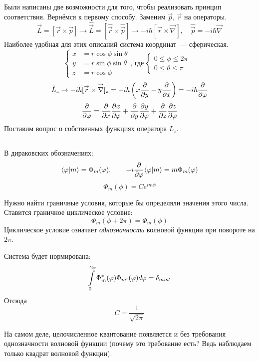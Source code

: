 \subsection{}
Были написаны две возможности для того, чтобы реализовать принцип соответствия. Вернёмся к первому способу.
Заменим $\vec p$, $\vec r$ на операторы.
\begingroup
\def \nla {\nabla}
\def \hvr {\hat{\vec r}}
\def \hvp {\hat{\vec p}}
\def \hvL {\hat{\vec L}}
    $$
        \vec L = [\vec r \times \vec p] \to
        \hvL = [\hvr \times \hvp ] \to
        -i\hbar [\vec r \times \vec \nla], \quad \hvp = -i\hbar \vec \nla
    $$
Наиболее удобная для этих описаний система координат~--- сферическая.
$$
    \begin{cases}
        x &= r \cos \phi \sin \theta \\
        y &= r \sin \phi \sin \theta \\
        z &= r \cos \phi
    \end{cases}, \, \text{где} \,
    \begin{cases}
        0 \leqslant \phi \leqslant 2\pi&\\
        0 \leqslant \theta \leqslant \pi&
    \end{cases}
$$
$$
    \Hat L_z \to -i\hbar [\vec r \times \vec \nla]_z = -i \hbar \left(
        x \ud{}{y} - y \ud{}{x}
    \right) = -i \hbar \ud{}{\phi}
$$
$$
    \dfrac{\partial }{\partial \varphi} = \dfrac{\partial }{\partial x} \dfrac{\partial x}{\partial \varphi} + \dfrac{\partial }{\partial y} \dfrac{\partial y}{\partial \varphi} + \dfrac{\partial }{\partial z} \dfrac{\partial z}{\partial \varphi}
$$
Поставим вопрос о собственных функциях оператора $L_z$.

\subsection{}

В дираковских обозначениях:
$$
    \langle \varphi | m \rangle = \Phi_m(\varphi), \qquad -i \dfrac{\partial }{\partial \varphi} \langle \varphi | m \rangle = m \Phi_m(\varphi)
$$
$$
    \Phi_m(\phi) = C e^{i m\phi}
$$

\Ans Нужно найти граничные условия, которые бы определяли значения этого числа. Ставится граничное циклическое условие:
$$
    \Phi_m(\phi + 2\pi) = \Phi_m(\phi)
$$
Циклическое условие означает \emph{однозначность} волновой функции при повороте на $2 \pi$.

Система будет нормирована:
$$
    \int\limits_0^{2\pi} \Phi_m^\ast (\varphi) \Phi_{m'} (\varphi) d \varphi = \delta_{mm'}
$$
Отсюда
$$
    C = \dfrac{1}{\sqrt{2\pi}}
$$

На самом деле, целочисленное квантование появляется и без требования однозначности волновой функции (почему это требование есть? Ведь наблюдаем только квадрат волновой функции).

